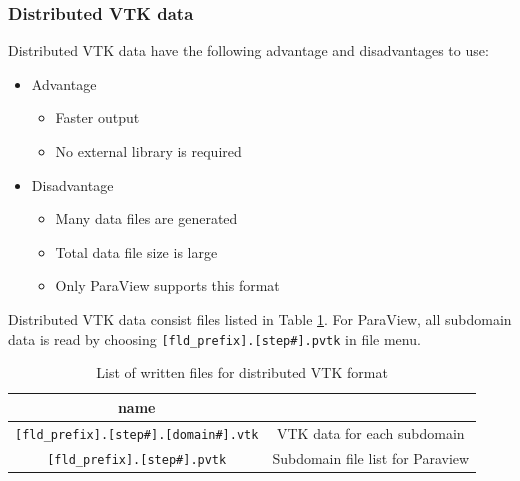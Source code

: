 \subsubsection{Distributed VTK data}
Distributed VTK data have the following advantage and disadvantages to use:
%
\begin{itemize}
\item Advantage
\begin{itemize} 
\item Faster output
\item No external library is required
\end{itemize}
\item Disadvantage
\begin{itemize} 
\item Many data files are generated
\item Total data file size is large
\item Only ParaView supports this format
\end{itemize}
\end{itemize}
%
Distributed VTK data consist files listed in Table \ref{table:parallel_vtk}. For ParaView, all subdomain data is read by choosing \verb|[fld_prefix].[step#].pvtk| in file menu.
%
\begin{table}[htdp]
\caption{List of written files for distributed VTK format}
\begin{center} 
\begin{tabular}{|c|c|}
\hline
 name &  \\ \hline \hline
\verb|[fld_prefix].[step#].[domain#].vtk|  & VTK data for each subdomain  \\ \hline
\verb|[fld_prefix].[step#].pvtk| & Subdomain file list for Paraview  \\ \hline
\end{tabular}
\end{center}
\label{table:parallel_vtk}
\end{table}
%

